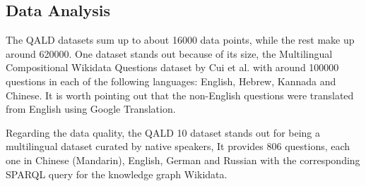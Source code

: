 \subsection{Data Analysis}


The QALD datasets sum up to about 16000 data points, while the rest make up around 620000. One dataset stands out because of its size, the Multilingual Compositional Wikidata Questions dataset by Cui et al. \cite{2021arXiv210803509C} with around 100000 questions in each of the following languages: English, Hebrew, Kannada and Chinese. It is worth pointing out that the non-English questions were translated from English using Google Translation.

Regarding the data quality, the QALD 10 dataset stands out for being a multilingual dataset curated by native speakers, It provides 806 questions, each one in Chinese (Mandarin), English, German and Russian with the corresponding SPARQL query for the knowledge graph Wikidata.

\iffalse
There were some small orthographic errors as for example the word character written as "charcter" in the following question: "In the film that has a charcter named Rev. Jackson P. Sayer, who played Michael Myers?" from the dataset Complex Web Questions by Talmor et al. 
\fi

\iffalse
Some of the questions are incomplete like the question in french "Quel est le" in the QALD 5 dataset which would be translated in English as "What is the"
\fi
{}

\iffalse
In regards of data quality, the QALD 10 dataset stands out for being a multilingual dataset curated by native speakers. It provides 806 questions, each question in Chinese (Mandarin), English, German and Russian with the corresponding SPARQL query on the knowledge graph Wikidata. 
\fi



